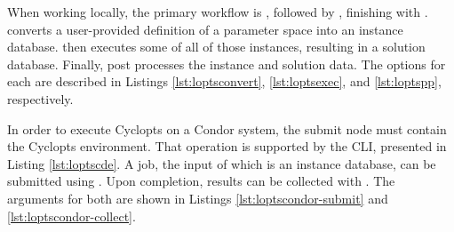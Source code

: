 When working locally, the primary workflow is , followed
by , finishing with .  converts a user-provided definition of a parameter space into an
instance database.  then executes some of all of those
instances, resulting in a solution database. Finally,  post
processes the instance and solution data. The options for each are described in
Listings \ref{lst:loptsconvert}, \ref{lst:loptsexec}, and \ref{lst:loptspp},
respectively.







In order to execute Cyclopts on a Condor system, the submit node must contain
the Cyclopts environment. That operation is supported by the 
CLI, presented in Listing \ref{lst:loptscde}. A job, the input of which is an
instance database, can be submitted using . Upon
completion, results can be collected with . The
arguments for both are shown in Listings \ref{lst:loptscondor-submit} and
\ref{lst:loptscondor-collect}.






